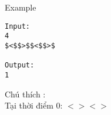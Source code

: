 Example
\begin{verbatim}
Input:
4
$<$$>$$<$$>$

Output:
1
\end{verbatim}  Chú thích :  
\\  Tại thời điểm 0: $<$$>$$<$$>$  
\\